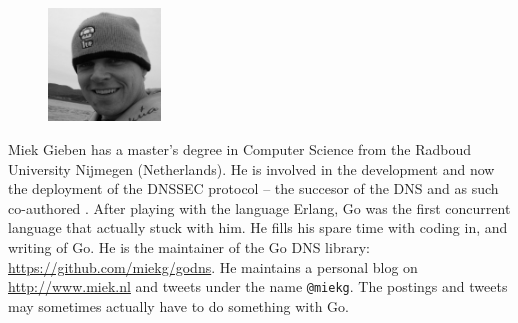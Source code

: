 \begin{figure}
  \begin{center}
  \includegraphics[width=3cm]{fig/avatar-miekg-300x300}
  \end{center}
\end{figure}
Miek Gieben has a master's degree in Computer Science from the Radboud University Nijmegen (Netherlands).
He is involved in the development and now the deployment of the DNSSEC protocol \cite{RFC4033,RFC4034,RFC4035} --
the succesor of the DNS and as such co-authored \cite{RFC4641}.
After playing with the language Erlang, Go was the first concurrent language
that actually stuck with him.
He fills his spare time with coding in, and writing of Go. He is the maintainer
of the Go DNS library: \url{https://github.com/miekg/godns}.
He maintains a personal blog on \url{http://www.miek.nl} and tweets
under the name \texttt{@miekg}. The postings and tweets may sometimes 
actually have to do something with Go.
